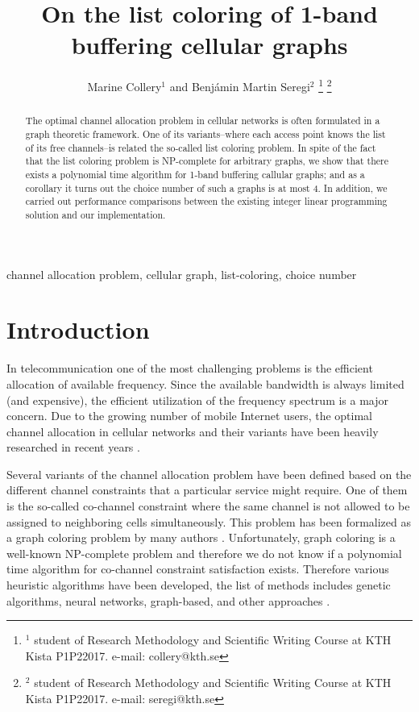 \documentclass[letterpaper, 10 pt, conference]{ieeeconf}  %
\title{\LARGE \bf
On the list coloring of 1-band buffering cellular graphs
}
\author{Marine Collery$^{1}$ and Benjámin Martin Seregi$^{2}$%
\thanks{$^{1}$ student of Research Methodology and Scientific Writing Course at KTH Kista P1P22017. e-mail: collery@kth.se}%
\thanks{$^{2}$ student of Research Methodology and Scientific Writing Course at KTH Kista P1P22017. e-mail: seregi@kth.se}%
}
\begin{document}
\maketitle
\thispagestyle{fancy}
\fancyhf{}

\begin{abstract}
The optimal channel allocation problem in cellular networks is often formulated in a graph theoretic framework. One of its variants\---where each access point knows the list of its free channels\---is related the so-called list coloring problem. In spite of the fact that the list coloring problem is NP-complete for arbitrary graphs, we show that there exists a polynomial time algorithm for 1-band buffering callular graphs; and as a corollary it turns out the choice number of such a graphs is at most 4. In addition, we carried out performance comparisons between the existing integer linear programming solution and our implementation.
\end{abstract}

\begin{keywords}
channel allocation problem, cellular graph, list-coloring, choice number
\end{keywords}

\section{Introduction}

In telecommunication one of the most challenging problems is the efficient allocation of available frequency. Since the available bandwidth is always limited (and expensive), the efficient utilization of the frequency spectrum is a major concern. Due to the growing number of mobile Internet users, the optimal channel allocation in cellular networks and their variants have been heavily researched in recent years \cite{Audhya:2011:SCA:1988563.1988571}.

Several variants of the channel allocation problem have been defined based on the different channel constraints that a particular service might require. One of them is the so-called co-channel constraint where the same channel is not allowed to be assigned to neighboring cells simultaneously. This problem has been formalized as a graph coloring problem by many authors \cite{1456167}. Unfortunately, graph coloring is a well-known NP-complete problem \cite{Kar72} and therefore we do not know if a polynomial time algorithm for co-channel constraint satisfaction exists. Therefore various heuristic algorithms have been developed, the list of methods includes genetic algorithms, neural networks, graph-based, and other approaches \cite{Audhya:2011:SCA:1988563.1988571}.
\end{document}
